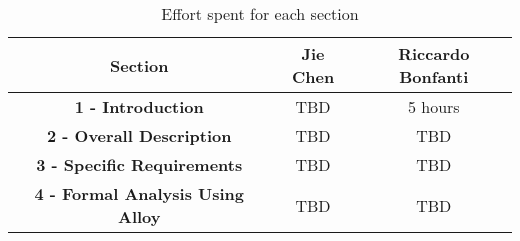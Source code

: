 \begin{table}[H]
    \centering
    \begin{tabular}{|c|c|c|}
    \hline
    \rowcolor{bluepoli!40}
    \textbf{Section} & \textbf{Jie Chen} & \textbf{Riccardo Bonfanti} \T\B \\
    \hline
     \textbf{1 - Introduction} & TBD & 5 hours \T\B \\
     \textbf{2 - Overall Description} & TBD & TBD \T\B\\
     \textbf{3 - Specific Requirements} & TBD & TBD \T\B\\
     \textbf{4 - Formal Analysis Using Alloy} & TBD & TBD  \T\B \\

    \hline
    \end{tabular}
    \\[10pt]
    \caption{Effort spent for each section}
    \label{table:effort}
\end{table}